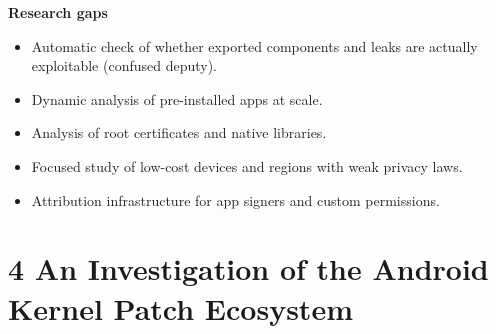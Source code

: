 \documentclass[11pt,a4paper]{article}
\begin{document}
\begin{enumerate}
    \vspace{4pt}
    \textbf{Research gaps}
    \begin{itemize}
        \item Automatic check of whether exported components and leaks are actually exploitable (confused deputy).
        \item Dynamic analysis of pre-installed apps at scale.
        \item Analysis of root certificates and native libraries.
        \item Focused study of low-cost devices and regions with weak privacy laws.
        \item Attribution infrastructure for app signers and custom permissions.
    \end{itemize}

\end{enumerate}

\newpage

\section{4 An Investigation of the Android Kernel Patch Ecosystem}
\end{document}
